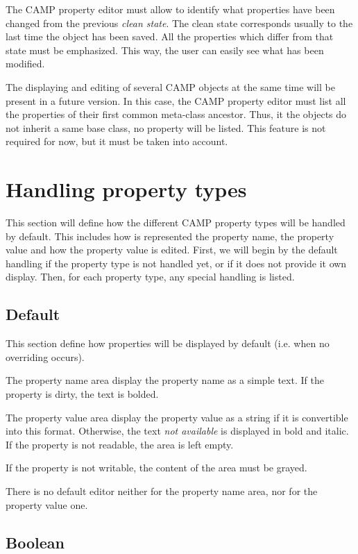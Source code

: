 \documentclass[a4paper, twoside]{report}
\begin{document}
The CAMP property editor must allow to identify what properties have been changed from the previous
\emph{clean state}. The clean state corresponds usually to the last time the object has been saved.
All the properties which differ from that state must be emphasized. This way, the user can easily
see what has been modified.

The displaying and editing of several CAMP objects at the same time will be present in a future
version. In this case, the CAMP property editor must list all the properties of their first common
meta-class ancestor. Thus, it the objects do not inherit a same base class, no property will be
listed. This feature is not required for now, but it must be taken into account.

\chapter{Handling property types\label{sec:property_types}}

This section will define how the different CAMP property types will be handled by default. This
includes how is represented the property name, the property value and how the property value is
edited. First, we will begin by the default handling if the property type is not handled yet,
or if it does not provide it own display. Then, for each property type, any special handling is
listed.

\section{Default}

This section define how properties will be displayed by default (i.e. when no overriding occurs).

The property name area display the property name as a simple text. If the property is dirty, the
text is bolded.

The property value area display the property value as a string if it is convertible into this
format. Otherwise, the text \emph{not available} is displayed in bold and italic. If the property is
not readable, the area is left empty.

If the property is not writable, the content of the area must be grayed.

There is no default editor neither for the property name area, nor for the property value one.

\section{Boolean}
\end{document}
